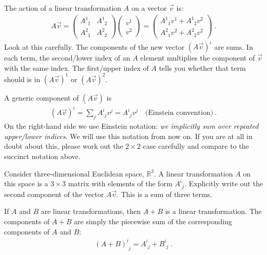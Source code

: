 The action of a linear transformation $A$ on a vector $\vec{v}$ is:
\begin{align}
  A\vec{v}
  =
  \begin{pmatrix}
    A^{1}_{\phantom{1}1} & A^{1}_{\phantom{1}2}
   \\
   A^{2}_{\phantom{2}1} & A^{2}_{\phantom{2}2}   
  \end{pmatrix} 
  \begin{pmatrix}
    v^1\\
    v^2
  \end{pmatrix}
  =
  \begin{pmatrix}
    A^1_{\phantom{1}1} v^1 + A^1_{\phantom{1}2}v^2\\
    A^2_{\phantom{2}1} v^2 + A^2_{\phantom{2}2}v^2
  \end{pmatrix} \ .
\end{align}
Look at this carefully. The components of the new vector $(A \vec{v})^i$ are sums. In each term, the second/lower index of an $A$ element multiplies the component of $\vec{v}$ with the same index. The first/upper index of $A$ tells you whether that term should is in $(A \vec{v})^1$ or $(A \vec{v})^2$. 

A generic component of $(A\vec{v})$ is
\begin{align}
  (A\vec{v})^i = \sum_j A^i_{\phantom{i}j} v^j
  = A^i_{\phantom{i}j} v^j \quad \text{(Einstein convention)}
   \ .
\end{align}
On the right-hand side we use Einstein notation: \emph{we implicitly sum over repeated upper/lower indices}. We will use this notation from now on.
%
If you are at all in doubt about this, please work out the $2\times 2$ case carefully and compare to the succinct notation above. 

\begin{exercise}
Consider three-dimensional Euclidean space, $\mathbb{R}^3$. A linear transformation $A$ on this space is a $3\times 3$ matrix with elements of the form $A^i_{\phantom{i}j}$. Explicitly write out the second component of the vector $A\vec{v}$. This is a sum of three terms.
\end{exercise}

If $A$ and $B$ are linear transformations, then $A+B$ is a linear transformation. The components of $A+B$ are simply the piecewise sum of the corresponding components of $A$ and $B$:
\begin{align}
  (A+B)^i_{\phantom i j} = A^i_{\phantom i j} + B ^i_{\phantom i j} \ .
\end{align}


